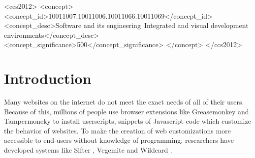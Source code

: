 \documentclass[sigconf,10pt]{acmart}
\begin{document}
\begin{CCSXML}
<ccs2012>
<concept>
<concept_id>10011007.10011006.10011066.10011069</concept_id>
<concept_desc>Software and its engineering~Integrated and visual development environments</concept_desc>
<concept_significance>500</concept_significance>
</concept>
</ccs2012>
\end{CCSXML}




\maketitle

\hypertarget{sec:introduction}{%
\section{Introduction}\label{sec:introduction}}

Many websites on the internet do not meet the exact needs of all of
their users. Because of this, millions of people use browser extensions
like Greasemonkey \citep{zotero-224} and Tampermoneky \citep{2021f} to
install userscripts, snippets of Javascript code which customize the
behavior of websites. To make the creation of web customizations more
accessible to end-users without knowledge of programming, researchers
have developed systems like Sifter \citep{huynh2006}, Vegemite
\citep{lin2009} and Wildcard \citep{litt2020, litt2020b}.
\end{document}
